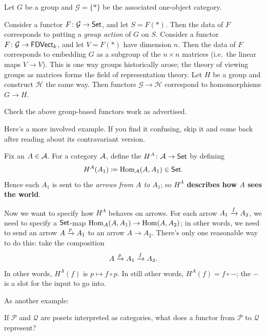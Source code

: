 \begin{example}
	Let $G$ be a group and $\mathcal G = \{\ast\}$ be the associated one-object category.
	\begin{enumerate}[(a)]
		\ii Consider a functor $F \colon \mathcal G \to \catname{Set}$, and let $S = F(\ast)$.
		Then the data of $F$ corresponds to putting a \emph{group action} of $G$ on $S$.
		\ii Consider a functor $F \colon \mathcal G \to \catname{FDVect}_k$, and let $V = F(\ast)$ have dimension $n$.
		Then the data of $F$ corresponds to embedding $G$ as a subgroup of the $n \times n$ matrices
		(i.e.\ the linear maps $V \to V$).
		This is one way groups historically arose; the theory of viewing groups as matrices
		forms the field of representation theory.
		\ii Let $H$ be a group and construct $\mathcal H$ the same way.
		Then functors $\mathcal G \to \mathcal H$ correspond to homomorphisms $G \to H$.
	\end{enumerate}
\end{example}
\begin{exercise}
	Check the above group-based functors work as advertised.
\end{exercise}

Here's a more involved example.
If you find it confusing,
skip it and come back after reading about its contravariant version.
\begin{example}
	\label{ex:covariant_yoneda}
	Fix an $A \in \AA$.
	For a category $\AA$, define the
	 $H^A \colon \AA \to \catname{Set}$
	by defining \[ H^A(A_1) \defeq \Hom_\AA (A, A_1) \in \catname{Set}. \]
	Hence each $A_1$ is sent to the \emph{arrows from $A$ to $A_1$};
	so \textbf{$H^A$ describes how $A$ sees the world}.

	Now we want to specify how $H^A$ behaves on arrows.
	For each arrow $A_1 \taking{f} A_2$, we need
	to specify a $\catname{Set}$-map $\Hom_\AA (A, A_1) \to \Hom(A, A_2)$;
	in other words, we need to send an arrow $A \taking{p} A_1$ to an arrow $A \to A_2$.
	There's only one reasonable way to do this: take the composition
	\[ A \taking{p} A_1 \taking{f} A_2. \]
	In other words, $H^A(f)$ is $p \mapsto f \circ p$.
	In still other words, $H^A(f) = f \circ -$;
	the $-$ is a slot for the input to go into.
\end{example}

As another example:
\begin{ques}
	If $\mathcal P$ and $\mathcal Q$ are posets interpreted as categories,
	what does a functor from $\mathcal P$ to $\mathcal Q$ represent?
\end{ques}

